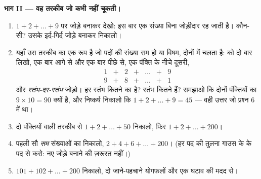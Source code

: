 \begin{problem}
\medskip
\noindent\textbf{भाग II --- वह तरकीब जो कभी नहीं चूकती।}
\begin{enumerate}[resume]
  \item $1 + 2 + \dots + 9$ पर जोड़े बनाकर देखो: इस बार एक
        संख्या बिना जोड़ीदार रह जाती है। कौन-सी? उसके इर्द-गिर्द
        जोड़े बनाकर  निकालो।
  \item यहाँ उस तरकीब का एक रूप है जो पदों की संख्या सम हो या
        विषम, दोनों में चलता है:  को दो बार लिखो, एक बार
        आगे से और एक बार पीछे से, एक पंक्ति के नीचे दूसरी,
        \[
        \begin{array}{ccccccc}
        1 & + & 2 & + & \dots & + & 9 \\
        9 & + & 8 & + & \dots & + & 1
        \end{array}
        \]
        और \emph{स्तंभ-दर-स्तंभ} जोड़ो। हर स्तंभ कितने का है?
        स्तंभ कितने हैं? समझाओ कि दोनों पंक्तियों का 
        $9 \times 10 = 90$ क्यों है, और निष्कर्ष निकालो कि
        $1 + 2 + \dots + 9 = 45$ --- वही उत्तर जो प्रश्न 6 में
        था।
  \item दो पंक्तियों वाली तरकीब से $1 + 2 + \dots + 50$ निकालो,
        फिर $1 + 2 + \dots + 200$।
  \item पहली सौ \emph{सम} संख्याओं का  निकालो,
        $2 + 4 + 6 + \dots + 200$। (हर पद की तुलना गाउस के 
        के पद से करो: नए जोड़े बनाने की ज़रूरत नहीं।)
  \item $101 + 102 + \dots + 200$ निकालो, दो जाने-पहचाने योगफलों
        और एक घटाव की मदद से।
\end{enumerate}


\end{problem}
